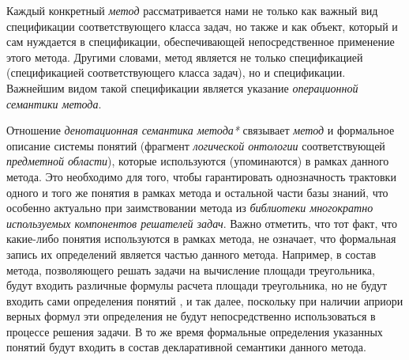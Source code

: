 Каждый конкретный \textit{метод} рассматривается нами не только как важный вид спецификации соответствующего класса задач, но также и как объект, который и сам нуждается в спецификации, обеспечивающей непосредственное применение этого метода. Другими словами, метод является не только спецификацией (спецификацией соответствующего класса задач), но и  спецификации. Важнейшим видом такой спецификации является указание \textit{операционной семантики метода}.

\begin{SCn}
	\begin{scnindent}
		\begin{scnindent}
		\end{scnindent}
	\end{scnindent}

\end{SCn}

Отношение \textit{денотационная семантика метода*} связывает \textit{метод} и формальное описание системы понятий (фрагмент \textit{логической онтологии} соответствующей \textit{предметной области}), которые используются (упоминаются) в рамках данного метода. Это необходимо для того, чтобы гарантировать однозначность трактовки одного и того же понятия в рамках метода и остальной части базы знаний, что особенно актуально при заимствовании метода из \textit{библиотеки многократно используемых компонентов решателей задач}. Важно отметить, что тот факт, что какие-либо понятия используются в рамках метода, не означает, что формальная запись их определений является частью данного метода. Например, в состав метода, позволяющего решать задачи на вычисление площади треугольника, будут входить различные формулы расчета площади треугольника, но не будут входить сами определения понятий ,  и так далее, поскольку при наличии априори верных формул эти определения не будут непосредственно использоваться в процессе решения задачи. В то же время формальные определения указанных понятий будут входить в состав декларативной семантики данного метода.

